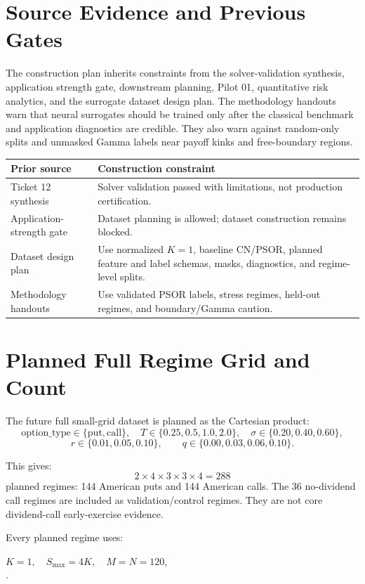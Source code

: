 \documentclass[11pt,a4paper]{article}
\newcommand{\code}[1]{\path{#1}}
\begin{document}
\section{Source Evidence and Previous Gates}

The construction plan inherits constraints from the solver-validation synthesis, application
strength gate, downstream planning, Pilot 01, quantitative risk analytics, and the surrogate
dataset design plan. The methodology handouts warn that neural surrogates should be trained only
after the classical benchmark and application diagnostics are credible. They also warn against
random-only splits and unmasked Gamma labels near payoff kinks and free-boundary regions.

\begin{longtable}{L{0.30\textwidth} L{0.50\textwidth}}
\toprule
Prior source & Construction constraint \\
\midrule
\endhead
Ticket 12 synthesis & Solver validation passed with limitations, not production certification. \\
Application-strength gate & Dataset planning is allowed; dataset construction remains blocked. \\
Dataset design plan & Use normalized \(K=1\), baseline CN/PSOR, planned feature and label schemas, masks, diagnostics, and regime-level splits. \\
Methodology handouts & Use validated PSOR labels, stress regimes, held-out regimes, and boundary/Gamma caution. \\
\bottomrule
\end{longtable}

\section{Planned Full Regime Grid and Count}

The future full small-grid dataset is planned as the Cartesian product:
\[
\text{option\_type}\in\{\text{put},\text{call}\},\quad
T\in\{0.25,0.5,1.0,2.0\},\quad
\sigma\in\{0.20,0.40,0.60\},
\]
\[
r\in\{0.01,0.05,0.10\},\qquad
q\in\{0.00,0.03,0.06,0.10\}.
\]

This gives:
\[
2 \times 4 \times 3 \times 3 \times 4 = 288
\]
planned regimes: 144 American puts and 144 American calls. The 36 no-dividend call regimes are
included as validation/control regimes. They are not core dividend-call early-exercise evidence.

Every planned regime uses:
\begin{center}
\(K=1,\quad S_{\max}=4K,\quad M=N=120\),\\
\code{solver_variant = baseline_cn_psor}.
\end{center}
\end{document}
